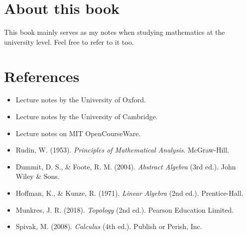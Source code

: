 \documentclass[10pt,a4 paper]{extreport}
\begin{document}
\section*{About this book}
This book mainly serves as my notes when studying mathematics at the university level. Feel free to refer to it too.

\section*{References}
\begin{itemize}
\item Lecture notes by the University of Oxford.
\item Lecture notes by the University of Cambridge. %
\item Lecture notes on MIT OpenCourseWare.
\item Rudin, W. (1953). \textit{Principles of Mathematical Analysis}. McGraw-Hill.
\item Dummit, D. S., \& Foote, R. M. (2004). \textit{Abstract Algebra} (3rd ed.). John Wiley \& Sons.
\item Hoffman, K., \& Kunze, R. (1971). \textit{Linear Algebra} (2nd ed.). Prentice-Hall.
\item Munkres, J. R. (2018). \textit{Topology} (2nd ed.). Pearson Education Limited.
\item Spivak, M. (2008). \textit{Calculus} (4th ed.). Publish or Perish, Inc.
\end{itemize}
\pagebreak
\end{document}

